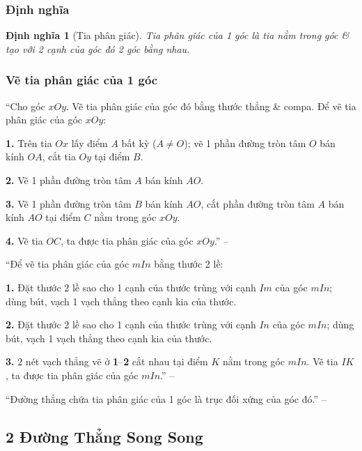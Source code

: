 \documentclass{article}
\numberwithin{equation}{section}
\newtheorem{dinhnghia}{Định nghĩa}[section]
\begin{document}
\subsubsection{Định nghĩa}

\begin{dinhnghia}[Tia phân giác]
	\emph{Tia phân giác} của 1 góc là tia nằm trong góc \& tạo với 2 cạnh của góc đó 2 góc bằng nhau.
\end{dinhnghia}

\subsubsection{Vẽ tia phân giác của 1 góc}
``Cho góc $xOy$. Vẽ tia phân giác của góc đó bằng thước thẳng \& compa. Để vẽ tia phân giác của góc $xOy$:
\begin{enumerate*}
	\item[\textbf{1.}] Trên tia $Ox$ lấy điểm $A$ bất kỳ ($A\ne O$); vẽ 1 phần đường tròn tâm $O$ bán kính $OA$, cắt tia $Oy$ tại điểm $B$.
	\item[\textbf{2.}] Vẽ 1 phần đường tròn tâm $A$ bán kính $AO$.
	\item[\textbf{3.}] Vẽ 1 phần đường tròn tâm $B$ bán kính $AO$, cắt phần đường tròn tâm $A$ bán kính $AO$ tại điểm $C$ nằm trong góc $xOy$.
	\item[\textbf{4.}] Vẽ tia $OC$, ta được tia phân giác của góc $xOy$.'' -- \cite[p. 97]{SGK_Toan_7_Canh_Dieu_tap_1}
\end{enumerate*}

``Để vẽ tia phân giác của góc $mIn$ bằng thước 2 lề:
\begin{enumerate*}
	\item[\textbf{1.}] Đặt thước 2 lề sao cho 1 cạnh của thước trùng với cạnh $Im$ của góc $mIn$; dùng bút, vạch 1 vạch thẳng theo cạnh kia của thước.
	\item[\textbf{2.}] Đặt thước 2 lề sao cho 1 cạnh của thước trùng với cạnh $In$ của góc $mIn$; dùng bút, vạch 1 vạch thẳng theo cạnh kia của thước.
	\item[\textbf{3.}] 2 nét vạch thẳng vẽ ở \textbf{1}--\textbf{2} cắt nhau tại điểm $K$ nằm trong góc $mIn$. Vẽ tia $IK$, ta được tia phân giác của góc $mIn$.'' -- \cite[p. 98]{SGK_Toan_7_Canh_Dieu_tap_1}
\end{enumerate*}
``Đường thẳng chứa tia phân giác của 1 góc là trục đối xứng của góc đó.'' -- \cite[p. 99]{SGK_Toan_7_Canh_Dieu_tap_1}

\subsection{2 Đường Thẳng Song Song}
\end{document}
